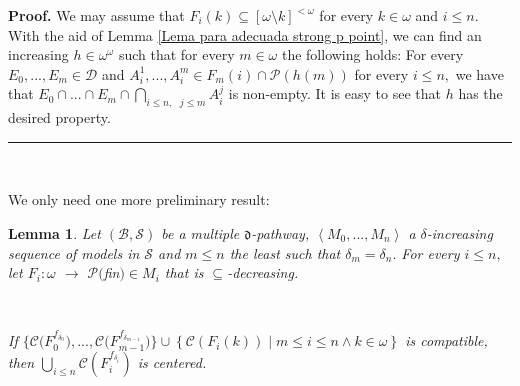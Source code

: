 \documentclass{article}%
\newtheorem{lemma}[theorem]{Lemma}
\newenvironment{proof}[1][Proof]{\noindent\textbf{#1.} }{\ \rule{0.5em}{0.5em}}
\begin{document}
\begin{proof}
We may assume that $F_{i}\left(  k\right)  \subseteq\left[  \omega\setminus
k\right]  ^{<\omega}$ for every $k\in\omega$ and $i\leq n.$ With the aid of
Lemma \ref{Lema para adecuada strong p point}, we can find an increasing
$h\in\omega^{\omega}$ such that for every $m\in\omega$ the following holds:
For every $E_{0},...,E_{m}\in\mathcal{D}$ and $A_{i}^{1},...,A_{i}^{m}\in
F_{m}\left(  i\right)  \cap\mathcal{P}\left(  h\left(  m\right)  \right)  $
for every $i\leq n,$ we have that $E_{0}\cap...\cap E_{m}\cap%
{\textstyle\bigcap\limits_{i\leq n,\text{ }j\leq m}}
A_{i}^{j}$ is non-empty. It is easy to see that $h$ has the desired property.
\end{proof}

\qquad\qquad\ \ 

We only need one more preliminary result:

\begin{lemma}
Let $\left(  \mathcal{B},\mathcal{S}\right)  $ be a multiple $\mathfrak{d}%
$-pathway, $\left\langle M_{0},...,M_{n}\right\rangle $ a $\delta$-increasing
sequence of models in $\mathcal{S}$ and $m\leq n$ the least such that
$\delta_{m}=\delta_{n}.$ For every $i\leq n,$ let $F_{i}:\omega$
$\longrightarrow$ $\mathcal{P(}$\textsf{fin}$\mathsf{)}\in M_{i}$ that is
$\subseteq$-decreasing\textsf{.}

\qquad\ \qquad\ \ \ \ \ \ \ \ \ \ 

If $\{\mathcal{C(}F_{0}^{f_{\delta_{0}}}),...,\mathcal{C(}F_{m-1}%
^{f_{\delta_{m-1}}})\}\cup\left\{  \mathcal{C}\left(  F_{i}\left(  k\right)
\right)  \mid m\leq i\leq n\wedge k\in\omega\right\}  $ is compatible, then $%
{\textstyle\bigcup\limits_{i\leq n}}
\mathcal{C}(F_{i}^{f_{\delta_{i}}})$ is centered.
\label{Lema pathway strong ppoint}
\end{lemma}
\end{document}
